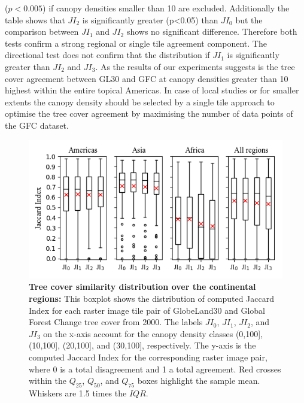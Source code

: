 ($p<0.005$) if canopy densities smaller than 10 are excluded. Additionally the table shows that $JI_2$ is significantly greater (p<0.05) than $JI_0$ but the comparison between $JI_1$ and $JI_2$ shows no significant difference. Therefore both tests confirm a strong regional or single tile agreement component. The directional test does not confirm that the distribution if $JI_1$ is significantly greater than $JI_2$ and $JI_3$. As the results of our experiments suggests is the tree cover agreement between \ac{GL30} and \ac{GFC} at canopy densities greater than 10 highest within the entire topical Americas. In case of local studies or for smaller extents the canopy density should be selected by a single tile approach to optimise the tree cover agreement by maximising the number of data points of the \ac{GFC} dataset.
			\begin{figure}[ht]
				\centering
				\includegraphics[scale=.91]{img/jaccard}
				\caption[Tree cover similarity distribution of the continental regions]{\textbf{Tree cover similarity distribution over the continental regions:} This boxplot shows the distribution of computed Jaccard Index for each raster image tile pair of GlobeLand30 and Global Forest Change tree cover from 2000. The labels $JI_0$, $JI_1$, $JI_2$, and $JI_3$ on the x-axis account for the canopy density classes (0,100], (10,100], (20,100], and (30,100], respectively. The y-axis is the computed Jaccard Index for the corresponding raster image pair, where 0 is a total disagreement and 1 a total agreement. Red crosses within the $Q_{25}$, $Q_{50}$, and $Q_{75}$ boxes highlight the sample mean. Whiskers are 1.5 times the $IQR$.}
				\label{fig:jaccard}
			\end{figure}
